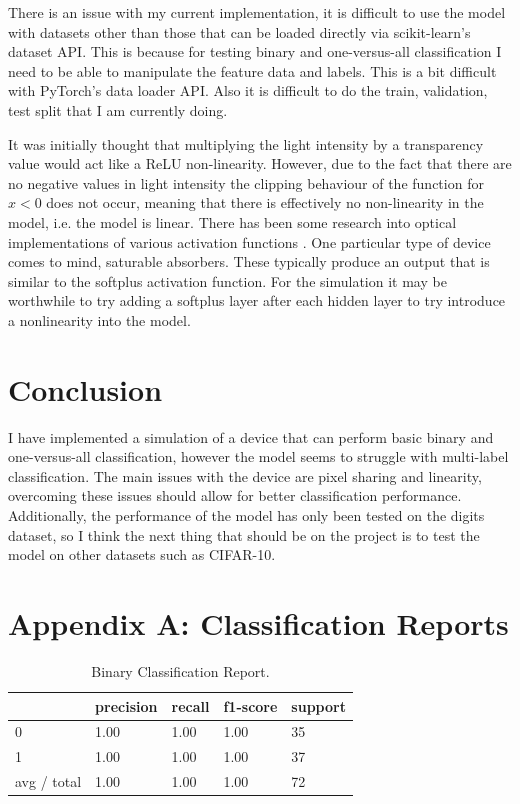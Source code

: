 \documentclass[]{article}
\begin{document}
There is an issue with my current implementation, it is difficult to use the model with datasets other than those that can be loaded directly via scikit-learn’s dataset API. This is because for testing binary and one-versus-all classification I need to be able to manipulate the feature data and labels. This is a bit difficult with PyTorch’s data loader API. Also it is difficult to do the train, validation, test split that I am currently doing. 


It was initially thought that multiplying the light intensity by a transparency value would act like a ReLU non-linearity. However, due to the fact that there are no negative values in light intensity the clipping behaviour of the function for $x < 0$ does not occur, meaning that there is effectively no non-linearity in the model, i.e. the model is linear. There has been some research into optical implementations of various activation functions \cite{George:18, LI2019405}. One particular type of device comes to mind, saturable absorbers. These typically produce an output that is similar to the softplus activation function. For the simulation it may be worthwhile to try adding a softplus layer after each hidden layer to try introduce a nonlinearity into the model.

\section{Conclusion}
I have implemented a simulation of a device that can perform basic binary and one-versus-all classification, however the model seems to struggle with multi-label classification. The main issues with the device are pixel sharing and linearity, overcoming these issues should allow for better classification performance. Additionally, the performance of the model has only been tested on the digits dataset, so I think the next thing that should be on the project is to test the model on other datasets such as CIFAR-10.

\newpage



\newpage
\appendix
\section*{Appendix A: Classification Reports}
\begin{table}[h]
	\begin{tabular}{l|llll}
		& precision & recall & f1-score & support \\ \hline
		0 & 1.00 & 1.00 & 1.00 & 35 \\
		1 & 1.00 & 1.00 & 1.00 & 37  \\
		avg / total & 1.00 & 1.00 & 1.00 & 72 
	\end{tabular}
	\caption{Binary Classification Report.}
\end{table}
\end{document}
